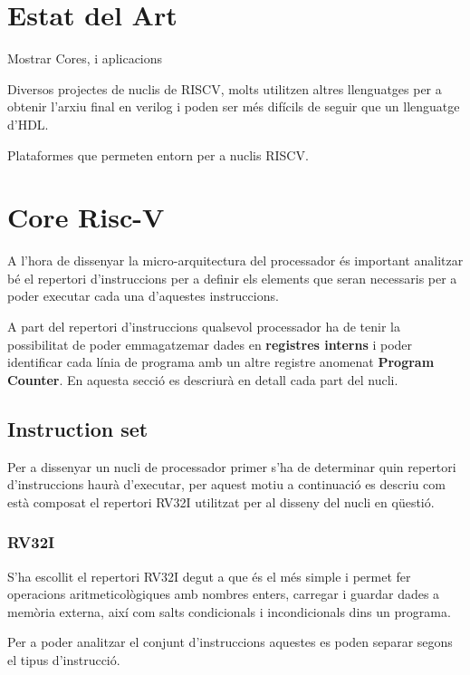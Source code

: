 \documentclass[10pt,a4paper,twocolumn,twoside]{article}
\begin{document}
\section{Estat del Art}
        Mostrar Cores, i aplicacions 
        
        Diversos projectes de nuclis de RISCV, molts utilitzen altres llenguatges per a obtenir l'arxiu final en verilog i poden ser més difícils de seguir que un llenguatge d'HDL.
        
        Plataformes que permeten entorn per a nuclis RISCV.

\section{Core Risc-V}
A l'hora de dissenyar la micro-arquitectura del processador és important analitzar bé el repertori d'instruccions per a definir els elements que seran necessaris per a poder executar cada una d'aquestes instruccions.

A part del repertori d'instruccions qualsevol processador ha de tenir la possibilitat de poder emmagatzemar dades en \textbf{registres interns} i poder identificar cada línia de programa amb un altre registre anomenat\textbf{ Program Counter}.
En aquesta secció es descriurà en detall cada part del nucli. 
    \subsection{Instruction set}
    Per a dissenyar un nucli de processador primer s'ha de determinar quin repertori d'instruccions haurà d'executar, per aquest motiu a continuació es descriu com està composat el repertori RV32I utilitzat per al disseny del nucli en qüestió.
        \subsubsection{RV32I}
        S'ha escollit el repertori RV32I degut a que és el més simple i permet fer operacions aritmeticològiques amb nombres enters, carregar i guardar dades a memòria externa, així com salts condicionals i incondicionals dins un programa.  
        
        Per a poder analitzar el conjunt d'instruccions aquestes es poden separar segons el tipus d'instrucció.
        
\end{document}
